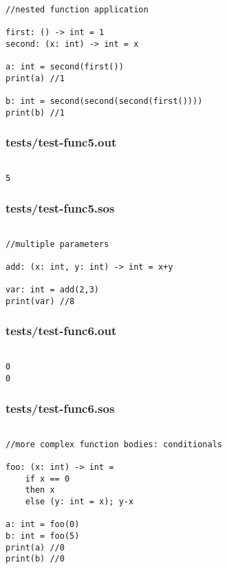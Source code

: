 \documentclass[main.tex]{subfiles}
\begin{document}
\begin{lstlisting}

//nested function application

first: () -> int = 1
second: (x: int) -> int = x

a: int = second(first())
print(a) //1

b: int = second(second(second(first())))
print(b) //1
\end{lstlisting}

\subsubsection{tests/test-func5.out}

\begin{lstlisting}

5
\end{lstlisting}

\subsubsection{tests/test-func5.sos}

\begin{lstlisting}

//multiple parameters

add: (x: int, y: int) -> int = x+y

var: int = add(2,3)
print(var) //8
\end{lstlisting}

\subsubsection{tests/test-func6.out}

\begin{lstlisting}

0
0
\end{lstlisting}

\subsubsection{tests/test-func6.sos}

\begin{lstlisting}

//more complex function bodies: conditionals

foo: (x: int) -> int = 
    if x == 0
    then x
    else (y: int = x); y-x

a: int = foo(0)
b: int = foo(5)
print(a) //0
print(b) //0
\end{lstlisting}
\end{document}
